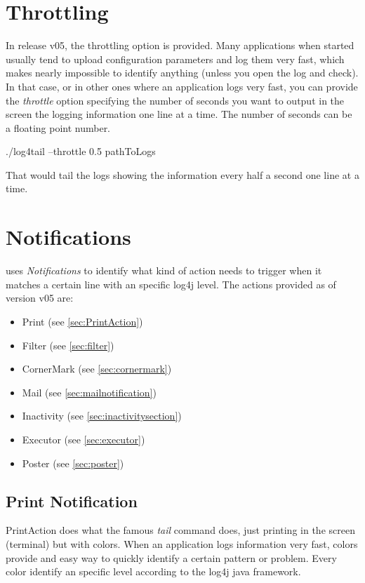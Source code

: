 \section{Throttling}
In release v05, the throttling option is provided. Many applications when
started usually tend to upload configuration parameters and log them very fast,
which makes nearly impossible to identify anything (unless you open the log and
check). In that case, or in other ones where an application logs very fast, you
can provide the \emph{throttle} option specifying the number of seconds you want
to output in the screen the logging information one line at a time. The number 
of seconds can be a floating point number.
\begin{cmd}
 ./log4tail --throttle 0.5 pathToLogs
\end{cmd}
That would tail the logs showing the information every half a second one line at 
a time.


\section{Notifications}
\logftailer{} uses \emph{Notifications} to identify what kind of action needs to
trigger when it matches a certain line with an specific log4j level. The actions
provided as of version v05 are:
\begin{itemize}
 \item Print (see \autoref{sec:PrintAction})
 \item Filter (see \autoref{sec:filter})
 \item CornerMark (see \autoref{sec:cornermark})
 \item Mail (see \autoref{sec:mailnotification})
 \item Inactivity (see \autoref{sec:inactivitysection})
 \item Executor (see \autoref{sec:executor})
 \item Poster (see \autoref{sec:poster})
\end{itemize}

\subsection{Print Notification}
\label{sec:PrintAction}PrintAction does what the famous \emph{tail} command does, just printing in the
screen (terminal) but with colors. When an application logs information very
fast, colors provide and easy way to quickly identify a certain pattern or
problem. Every color identify an specific level according to the log4j java
framework.

